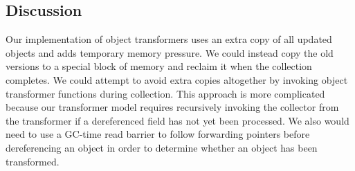 
\subsection{Discussion}

Our implementation of object transformers uses an extra copy of all updated objects and adds
temporary memory pressure.
We  could instead copy the old versions to a special block of memory
and reclaim it when the collection completes. We could attempt to avoid
extra copies altogether by invoking object 
transformer functions during collection.  This approach is more
complicated because our transformer model requires recursively invoking the collector
from the transformer if a dereferenced field has not yet been
processed.  We also would need to use a  GC-time read barrier
to follow forwarding pointers before dereferencing an object in order
to determine whether an object has been transformed.


